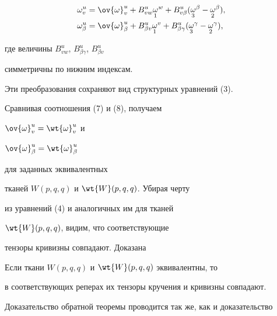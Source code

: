 \begin{equation}


\begin{split}


\omega^{u}_{v}&=\ov{\omega}^{u}_{v}+


B^{u}_{v w}{\crazy{\omega}{1}}^{w}+B^{u}_{v \beta}


({\crazy{\omega}{3}}^{\beta}-{\crazy{\omega}{2}}^{\beta}),\\


\omega^{u}_{\beta}&=\ov{\omega}^{u}_{\beta}+


B^{u}_{\beta v}{\crazy{\omega}{1}}^{v}+


B^{u}_{\beta \gamma}({\crazy{\omega}{3}}^{\gamma}-{\crazy{\omega}{2}}^{\gamma}),


\end{split}


\end{equation}


где величины $B^{u}_{v w}$, $B^{u}_{\beta \gamma}$, $B^{u}_{\beta v}$


симметричны по нижним индексам.


Эти преобразования сохраняют вид структурных уравнений (3).


Сравнивая соотношения (7) и (8), получаем


$\ov{\omega}^{u}_{v}=\wt{\omega}^{u}_{v}$ и


$\ov{\omega}^{u}_{\beta}=\wt{\omega}^{u}_{\beta}$


для заданных эквивалентных


тканей $W(p,q,q)$ и $\wt{W}(p,q,q)$. Убирая черту


из уравнений  (4) и аналогичных им для тканей


$\wt{W}(p,q,q)$, видим, что соответствующие


тензоры кривизны совпадают. Доказана








\begin{thm}


Если ткани $W(p,q,q)$ и $\wt{W}(p,q,q)$ эквивалентны, то


в соответствующих реперах их тензоры кручения и кривизны совпадают.


\end{thm}





Доказательство обратной теоремы проводится так же, как и доказательство


